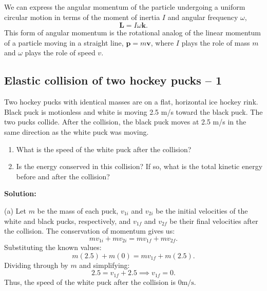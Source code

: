 \documentclass[../main.tex]{subfiles}
\begin{document}
We can express the angular momentum of the particle undergoing a uniform circular motion in terms of the moment of inertia $I$ and angular frequency $\omega$,
\begin{equation}
    \mathbf{L} = I \omega \mathbf{k}.
\end{equation}
This form of angular momentum is the rotational analog of the linear momentum of a particle moving in a straight line, $\mathbf{p} = m \mathbf{v}$, where $I$ plays the role of mass $m$ and $\omega$ plays the role of speed $v$.

\subsection{Elastic collision of two hockey pucks -- 1}

Two hockey pucks with identical masses are on a flat, horizontal ice hockey rink. Black puck is motionless and white is moving 2.5 m/s toward the black puck. The two pucks collide. After the collision, the black puck moves at 2.5 m/s in the same direction as the white puck was moving. 

\begin{enumerate}
    \item [(a)] What is the speed of the white puck after the collision?
    \item [(b)] Is the energy conserved in this collision? If so, what is the total kinetic energy before and after the collision?
\end{enumerate}

\textbf{Solution:} 

(a) Let $m$ be the mass of each puck, $v_{1i}$ and $v_{2i}$ be the initial velocities of the white and black pucks, respectively, and $v_{1f}$ and $v_{2f}$ be their final velocities after the collision. The conservation of momentum gives us:
\begin{equation}
m v_{1i} + m v_{2i} = m v_{1f} + m v_{2f}.
\end{equation}
Substituting the known values:
\begin{equation}
m (2.5) + m (0) = m v_{1f} + m (2.5).
\end{equation}
Dividing through by $m$ and simplifying:
\begin{equation}
2.5 = v_{1f} + 2.5 \implies v_{1f} = 0.
\end{equation}
Thus, the speed of the white puck after the collision is $\boxed{0 \text{m/s}}$.
\end{document}
